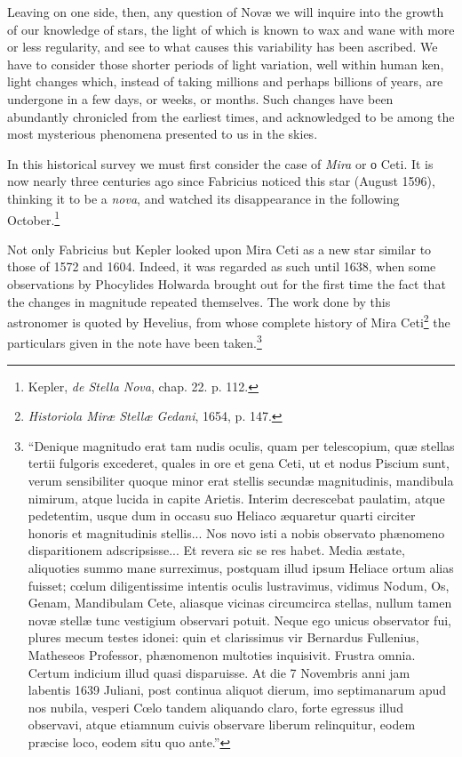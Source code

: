 \documentclass[a4paper, 12pt, oneside, polutonikogreek, english]{article}
\begin{document}
Leaving on one side, then, any question of Novæ we will inquire into the growth of our knowledge of stars, the light of which is known to wax and wane with more or less regularity, and see to what causes this variability has been ascribed. We have to consider those shorter periods of light variation, well within human ken, light changes which, instead of taking millions and perhaps billions of years, are undergone in a few days, or weeks, or months. Such changes have been abundantly chronicled from the earliest times, and acknowledged to be among the most mysterious phenomena presented to us in the skies.

In this historical survey we must first consider the case of \emph{Mira} or ο Ceti. It is now nearly three centuries ago since Fabricius noticed this star (August 1596), thinking it to be a \emph{nova}, and watched its disappearance in the following October.\footnote{Kepler, \emph{de Stella Nova}, chap. 22. p. 112.}

Not only Fabricius but Kepler looked upon Mira Ceti as a new star similar to those of 1572 and 1604. Indeed, it was regarded as such until 1638, when some observations by Phocylides Holwarda brought out for the first time the fact that the changes in magnitude repeated themselves. The work done by this astronomer is quoted by Hevelius, from whose complete history of Mira Ceti\footnote{\emph{Historiola Miræ Stellæ Gedani}, 1654, p. 147.} the particulars given in the note have been taken.\footnote{``Denique magnitudo erat tam nudis oculis, quam per telescopium, quæ stellas tertii fulgoris excederet, quales in ore et gena Ceti, ut et nodus Piscium sunt, verum sensibiliter quoque minor erat stellis secundæ magnitudinis, mandibula nimirum, atque lucida in capite Arietis. Interim decrescebat paulatim, atque pedetentim, usque dum in occasu suo Heliaco æquaretur quarti circiter honoris et magnitudinis stellis... Nos novo isti a nobis observato phænomeno disparitionem adscripsisse... Et revera sic se res habet. Media æstate, aliquoties summo mane surreximus, postquam illud ipsum Heliace ortum alias fuisset; cœlum diligentissime intentis oculis lustravimus, vidimus Nodum, Os, Genam, Mandibulam Cete, aliasque vicinas circumcirca stellas, nullum tamen novæ stellæ tunc vestigium observari potuit. Neque ego unicus observator fui, plures mecum testes idonei: quin et clarissimus vir Bernardus Fullenius, Matheseos Professor, phænomenon multoties inquisivit. Frustra omnia. Certum indicium illud quasi disparuisse. At die 7 Novembris anni jam labentis 1639 Juliani, post continua aliquot dierum, imo septimanarum apud nos nubila, vesperi Cœlo tandem aliquando claro, forte egressus illud observavi, atque etiamnum cuivis observare liberum relinquitur, eodem præcise loco, eodem situ quo ante.''}
\end{document}
